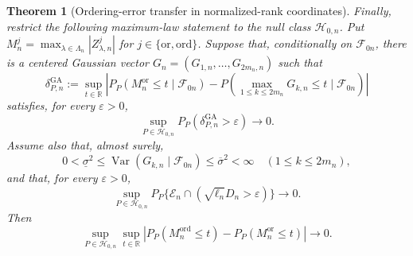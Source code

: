 \documentclass[11pt]{article}
\newtheorem{theorem}{Theorem}[section]
\theoremstyle{definition}
\newcommand{\1}{\mathbf 1}\newcommand{\op}{\operatorname}
\begin{document}
\begin{theorem}[Ordering-error transfer in normalized-rank coordinates]
Finally, restrict the following maximum-law statement to the null
class $\mathcal H_{0,n}$.  Put
$M_n^j=\max_{\lambda\in\Lambda_n}|Z_{\lambda,n}^j|$ for
$j\in\{\mathrm{or},\mathrm{ord}\}$.  Suppose that, conditionally on
$\mathcal F_{0n}$, there is a centered Gaussian vector
$G_n=(G_{1,n},\ldots,G_{2m_n,n})$ such that
\begin{equation}
 \delta_{P,n}^{\mathrm{GA}}
 :=\sup_{t\in\mathbb R}
 \left|
 P_P(M_n^{\mathrm{or}}\le t\mid\mathcal F_{0n})
 -P\!\left(
    \max_{1\le k\le2m_n}G_{k,n}\le t
    \mid\mathcal F_{0n}
   \right)
 \right|
 \label{eq:T4-GA-error}
\end{equation}
satisfies, for every $\varepsilon>0$,
\begin{equation}
 \sup_{P\in\mathcal H_{0,n}}
 P_P(\delta_{P,n}^{\mathrm{GA}}>\varepsilon)\to0.
 \label{eq:T4-uniform-GA}
\end{equation}
Assume also that, almost surely,
\begin{equation}
 0<\underline\sigma^2
 \le\operatorname{Var}(G_{k,n}\mid\mathcal F_{0n})
 \le\overline\sigma^2<\infty
 \quad(1\le k\le2m_n),
 \label{eq:T4-Gaussian-variances}
\end{equation}
and that, for every $\varepsilon>0$,
\begin{equation}
 \sup_{P\in\mathcal H_{0,n}}
 P_P\{\mathcal E_n\cap
       (\sqrt{\ell_n}D_n>\varepsilon)\}\to0.
 \label{eq:T4-maximum-rate}
\end{equation}
Then
\begin{equation}
 \sup_{P\in\mathcal H_{0,n}}
 \sup_{t\in\mathbb R}
 \left|
 P_P(M_n^{\mathrm{ord}}\le t)
 -P_P(M_n^{\mathrm{or}}\le t)
 \right|\to0.
 \label{eq:T4-maximum-equivalence}
\end{equation}
\end{theorem}
\end{document}
